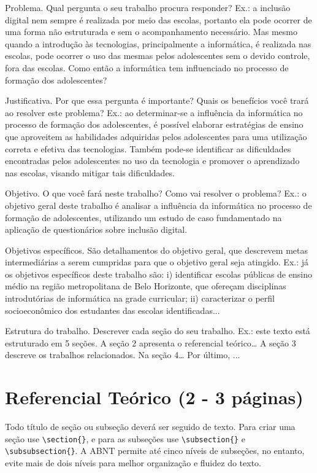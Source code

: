  Problema. Qual pergunta o seu trabalho procura responder? 
	Ex.: a inclusão digital nem sempre é realizada por meio das escolas, portanto ela pode ocorrer de uma forma não estruturada e sem o acompanhamento necessário. Mas mesmo quando a introdução às tecnologias, principalmente a informática, é realizada nas escolas, pode ocorrer o uso das mesmas pelos adolescentes sem o devido controle, fora das escolas. Como então a informática tem influenciado no processo de formação dos adolescentes?
	
 Justificativa. Por que essa pergunta é importante? Quais os benefícios você trará ao resolver este problema?
	Ex.: ao determinar-se a influência da informática no processo de formação dos adolescentes, é possível elaborar estratégias de ensino que aproveitem as habilidades adquiridas pelos adolescentes para uma utilização correta e efetiva das tecnologias. Também pode-se identificar as dificuldades encontradas pelos adolescentes no uso da tecnologia e promover o aprendizado nas escolas, visando mitigar tais dificuldades.
	
 Objetivo. O que você fará neste trabalho? Como vai resolver o problema?
	Ex.: o objetivo geral deste trabalho é analisar a influência da informática no processo de formação de adolescentes, utilizando um estudo de caso fundamentado na aplicação de questionários sobre inclusão digital.
	
 Objetivos específicos. São detalhamentos do objetivo geral, que descrevem metas intermediárias a serem cumpridas para que o objetivo geral seja atingido.
	Ex.: já os objetivos específicos deste trabalho são: i) identificar escolas públicas de ensino médio na região metropolitana de Belo Horizonte, que ofereçam disciplinas introdutórias de informática na grade curricular; ii) caracterizar o perfil socioeconômico dos estudantes das escolas identificadas...
	
 Estrutura do trabalho. Descrever cada seção do seu trabalho.	
	Ex.: este texto está estruturado em 5 seções. A seção 2 apresenta o referencial teórico… A seção 3 descreve os trabalhos relacionados. Na seção 4… Por último, ...


\estrutura\section{\esp Referencial Teórico (2 - 3 páginas)}\instrucao

Todo título de seção ou subseção deverá ser seguido de texto.  Para criar uma seção use \verb|\section{}|, e para as subseções use \verb|\subsection{}| e \verb|\subsubsection{}|. A ABNT permite até cinco níveis de subseções, no entanto, evite mais de dois níveis para melhor organização e fluidez do texto.


